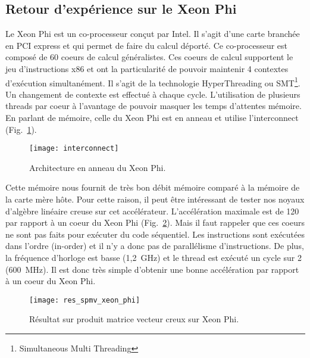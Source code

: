 \newpage
\subsection{Retour d'expérience sur le Xeon Phi}
Le Xeon Phi est un co-processeur conçut par Intel.
%
Il s'agit d'une carte branchée en PCI express et qui permet de faire du calcul déporté.
%
Ce co-processeur est composé de 60 coeurs de calcul généralistes.
%
Ces coeurs de calcul supportent le jeu d'instructions x86 et ont la particularité de pouvoir maintenir 4 contextes d'exécution simultanément.
%
Il s'agit de la technologie HyperThreading ou SMT\footnote{Simultaneous Multi Threading}.
%
Un changement de contexte est effectué à chaque cycle.
%
L'utilisation de plusieurs threads par coeur à l'avantage de pouvoir masquer les temps d'attentes mémoire.
%
En parlant de mémoire, celle du Xeon Phi est en anneau et utilise l'interconnect (Fig.~\ref{fig:interconnect}).

\begin{figure}[t!]
  \centering
  \texttt{[image: interconnect]}
  \caption{Architecture en anneau du Xeon Phi.}
  \label{fig:interconnect}
\end{figure}


Cette mémoire nous fournit de très bon débit mémoire comparé à la mémoire de la carte mère hôte.
%
Pour cette raison, il peut être intéressant de tester nos noyaux d'algèbre linéaire creuse sur cet accélérateur.
%
L'accélération maximale est de 120 par rapport à un coeur du Xeon Phi (Fig.~\ref{fig:res_spmv_xeon_phi}).
%
Mais il faut rappeler que ces coeurs ne sont pas faits pour exécuter du code séquentiel.
%
Les instructions sont exécutées dans l'ordre (in-order) et il n'y a donc pas de parallélisme d'instructions.
%
De plus, la fréquence d'horloge est basse (1,2~GHz) et le thread est exécuté un cycle sur 2 (600~MHz).
%
Il est donc très simple d'obtenir une bonne accélération par rapport à un coeur du Xeon Phi.

\begin{figure}[t!]
  \centering
  \texttt{[image: res\_spmv\_xeon\_phi]}
  \caption{Résultat sur produit matrice vecteur creux sur Xeon Phi.}
  \label{fig:res_spmv_xeon_phi}
\end{figure}



